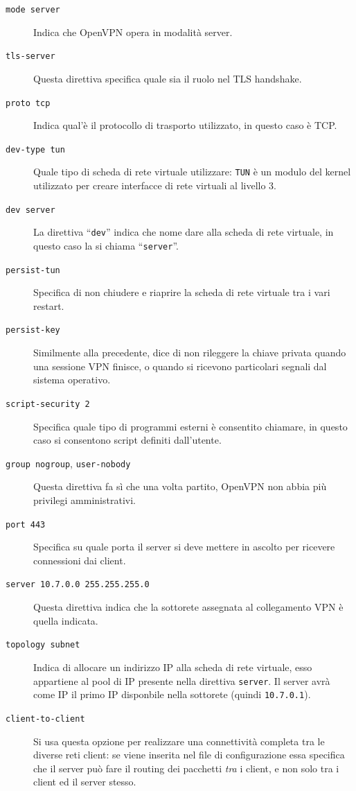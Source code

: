\begin{description}
	\item[\texttt{mode server}]Indica che OpenVPN opera in modalità server.
	\item[\texttt{tls-server}]Questa direttiva specifica quale sia il ruolo nel TLS
	handshake.
	\item[\texttt{proto tcp}]Indica qual'è il protocollo di trasporto utilizzato,
	in questo caso è TCP.
	\item[\texttt{dev-type tun}]Quale tipo di scheda di rete virtuale utilizzare:
	\texttt{TUN} è un modulo del kernel utilizzato per creare interfacce di rete virtuali
	al livello 3.
	\item[\texttt{dev server}]La direttiva ``\texttt{dev}'' indica che nome dare
	alla scheda di rete virtuale, in questo caso la si chiama ``\texttt{server}''.
	\item[\texttt{persist-tun}]Specifica di non chiudere e riaprire la scheda di rete
	virtuale tra i vari restart.
	\item[\texttt{persist-key}]Similmente alla precedente, dice di non rileggere la chiave privata quando una
	sessione VPN finisce, o quando si ricevono particolari segnali dal sistema operativo.
	\item[\texttt{script-security 2}]Specifica quale tipo di programmi esterni è consentito
	chiamare, in questo caso si consentono script definiti dall'utente.
	\item[\texttt{group nogroup}, \texttt{user-nobody}]Questa direttiva fa
	sì che una volta partito, OpenVPN
	non abbia più privilegi amministrativi.
	\item[\texttt{port 443}]Specifica su quale porta il server si deve mettere in ascolto per
	ricevere connessioni dai client.
	\item[\texttt{server 10.7.0.0 255.255.255.0}]Questa direttiva indica che la sottorete
	assegnata al collegamento VPN è quella indicata.
	\item[\texttt{topology subnet}]Indica di allocare un indirizzo IP alla scheda
	di rete virtuale, esso appartiene al pool di IP presente nella direttiva \texttt{server}.
	Il server avrà come IP il primo IP disponbile nella sottorete (quindi \texttt{10.7.0.1}).
	\item[\texttt{client-to-client}]Si usa questa opzione per realizzare una connettività
	completa tra le diverse reti client: se viene inserita nel file di configurazione essa
	specifica che il server può fare il routing dei pacchetti \textit{tra} i client, e non
	solo tra i client ed il server stesso.

\end{description}
